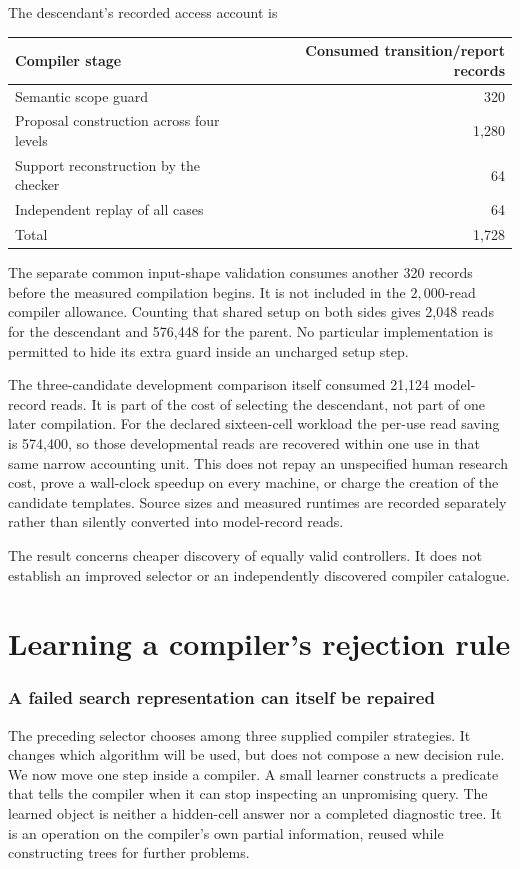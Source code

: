 \documentclass[11pt,letterpaper]{article}
\theoremstyle{plain}
\theoremstyle{definition}
\begin{document}
The descendant's recorded access account is
\begin{center}\begin{tabular}{@{}lr@{}}\toprule
Compiler stage & Consumed transition/report records\\\midrule
Semantic scope guard & 320\\
Proposal construction across four levels & 1,280\\
Support reconstruction by the checker & 64\\
Independent replay of all cases & 64\\\midrule
Total & 1,728\\\bottomrule
\end{tabular}\end{center}
The separate common input-shape validation consumes another 320 records before the measured compilation begins. It is not included in the $2{,}000$-read compiler allowance. Counting that shared setup on both sides gives 2,048 reads for the descendant and 576,448 for the parent. No particular implementation is permitted to hide its extra guard inside an uncharged setup step.

The three-candidate development comparison itself consumed 21,124 model-record reads. It is part of the cost of selecting the descendant, not part of one later compilation. For the declared sixteen-cell workload the per-use read saving is 574,400, so those developmental reads are recovered within one use in that same narrow accounting unit. This does not repay an unspecified human research cost, prove a wall-clock speedup on every machine, or charge the creation of the candidate templates. Source sizes and measured runtimes are recorded separately rather than silently converted into model-record reads.

The result concerns cheaper discovery of equally valid controllers. It does not establish an improved selector or an independently discovered compiler catalogue.

\clearpage\part{Learning a compiler's rejection rule}\label{part:rule-learning}
\section{A failed search representation can itself be repaired}\label{sec:search-features}
The preceding selector chooses among three supplied compiler strategies. It changes which algorithm will be used, but does not compose a new decision rule. We now move one step inside a compiler. A small learner constructs a predicate that tells the compiler when it can stop inspecting an unpromising query. The learned object is neither a hidden-cell answer nor a completed diagnostic tree. It is an operation on the compiler's own partial information, reused while constructing trees for further problems.
\end{document}

